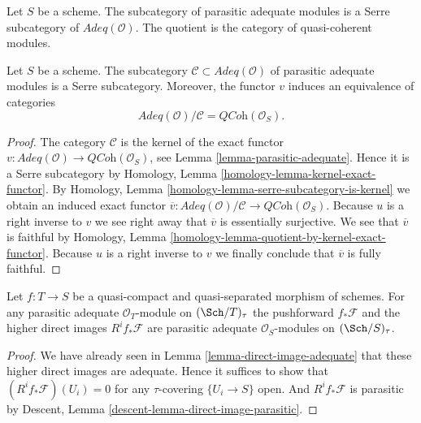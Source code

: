 \noindent
Let $S$ be a scheme.
The subcategory of parasitic adequate modules is a Serre subcategory of
$\textit{Adeq}(\mathcal{O})$. The quotient is the category of
quasi-coherent modules.

\begin{lemma}
\label{lemma-adequate-by-parasitic}
Let $S$ be a scheme. The subcategory
$\mathcal{C} \subset \textit{Adeq}(\mathcal{O})$ of parasitic adequate
modules is a Serre subcategory. Moreover, the functor $v$ induces
an equivalence of categories
$$
\textit{Adeq}(\mathcal{O}) / \mathcal{C} = \textit{QCoh}(\mathcal{O}_S).
$$
\end{lemma}

\begin{proof}
The category $\mathcal{C}$ is the kernel of the exact functor
$v : \textit{Adeq}(\mathcal{O}) \to \textit{QCoh}(\mathcal{O}_S)$, see
Lemma \ref{lemma-parasitic-adequate}.
Hence it is a Serre subcategory by
Homology, Lemma \ref{homology-lemma-kernel-exact-functor}.
By
Homology, Lemma \ref{homology-lemma-serre-subcategory-is-kernel}
we obtain an induced exact functor
$\overline{v} :
\textit{Adeq}(\mathcal{O}) / \mathcal{C}
\to
\textit{QCoh}(\mathcal{O}_S)$.
Because $u$ is a right inverse to $v$ we see right away that
$\overline{v}$ is essentially surjective.
We see that $\overline{v}$ is faithful by
Homology, Lemma \ref{homology-lemma-quotient-by-kernel-exact-functor}.
Because $u$ is a right inverse to $v$ we finally conclude that
$\overline{v}$ is fully faithful.
\end{proof}

\begin{lemma}
\label{lemma-direct-image-parasitic-adequate}
Let $f : T \to S$ be a quasi-compact and quasi-separated morphism
of schemes. For any parasitic adequate $\mathcal{O}_T$-module on
$(\Sch/T)_\tau$ the pushforward
$f_*\mathcal{F}$ and the higher direct images $R^if_*\mathcal{F}$
are parasitic adequate $\mathcal{O}_S$-modules on $(\Sch/S)_\tau$.
\end{lemma}

\begin{proof}
We have already seen in
Lemma \ref{lemma-direct-image-adequate}
that these higher direct images are adequate.
Hence it suffices to show that
$(R^if_*\mathcal{F})(U_i) = 0$ for any $\tau$-covering
$\{U_i \to S\}$ open. And $R^if_*\mathcal{F}$
is parasitic by
Descent, Lemma \ref{descent-lemma-direct-image-parasitic}.
\end{proof}














